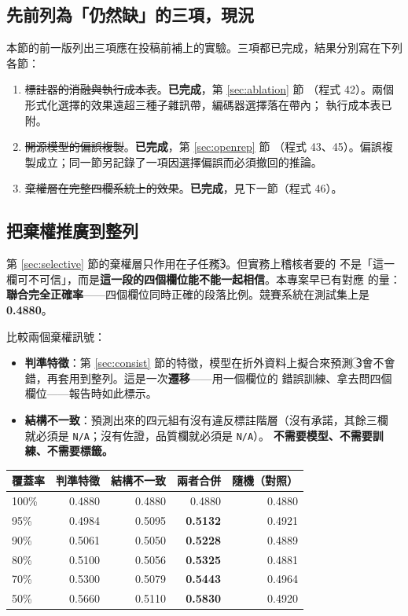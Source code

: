 \documentclass[11pt,a4paper]{ctexart}
\newcommand{\fn}[1]{\texttt{#1}}
\begin{document}
\subsection{先前列為「仍然缺」的三項，現況}

本節的前一版列出三項應在投稿前補上的實驗。三項都已完成，結果分別寫在下列各節：

\begin{enumerate}[leftmargin=2em, itemsep=4pt]
  \item \sout{標註器的消融與執行成本表}。\textbf{已完成}，第 \ref{sec:ablation} 節
        （程式 42）。兩個形式化選擇的效果遠超三種子雜訊帶，編碼器選擇落在帶內；
        執行成本表已附。
  \item \sout{開源模型的偏誤複製}。\textbf{已完成}，第 \ref{sec:openrep} 節
        （程式 43、45）。偏誤複製成立；同一節另記錄了一項因選擇偏誤而必須撤回的推論。
  \item \sout{棄權層在完整四欄系統上的效果}。\textbf{已完成}，見下一節（程式 46）。
\end{enumerate}

\subsection{把棄權推廣到整列}
\label{sec:jointabstain}

第 \ref{sec:selective} 節的棄權層只作用在子任務\textcircled{3}。但實務上稽核者要的
不是「這一欄可不可信」，而是\textbf{這一段的四個欄位能不能一起相信}。本專案早已有對應
的量：\textbf{聯合完全正確率}——四個欄位同時正確的段落比例。競賽系統在測試集上是
\textbf{0.4880}。

比較兩個棄權訊號：

\begin{itemize}[leftmargin=2em, itemsep=3pt]
  \item \textbf{判準特徵}：第 \ref{sec:consist} 節的特徵，模型在折外資料上擬合來預測
        \textcircled{3}會不會錯，再套用到整列。這是一次\textbf{遷移}——用一個欄位的
        錯誤訓練、拿去問四個欄位——報告時如此標示。
  \item \textbf{結構不一致}：預測出來的四元組有沒有違反標註階層（沒有承諾，其餘三欄
        就必須是 \fn{N/A}；沒有佐證，品質欄就必須是 \fn{N/A}）。
        \textbf{不需要模型、不需要訓練、不需要標籤。}
\end{itemize}

\begin{table}[h]
\centering\small
\begin{tabular}{@{}lrrrr@{}}
\toprule
覆蓋率 & 判準特徵 & 結構不一致 & 兩者合併 & 隨機（對照） \\
\midrule
100\% & 0.4880 & 0.4880 & 0.4880 & 0.4880 \\
95\% & 0.4984 & 0.5095 & \textbf{0.5132} & 0.4921 \\
90\% & 0.5061 & 0.5050 & \textbf{0.5228} & 0.4889 \\
80\% & 0.5100 & 0.5056 & \textbf{0.5325} & 0.4881 \\
70\% & 0.5300 & 0.5079 & \textbf{0.5443} & 0.4964 \\
50\% & 0.5660 & 0.5110 & \textbf{0.5830} & 0.4920 \\
\bottomrule
\end{tabular}
\end{table}
\end{document}

